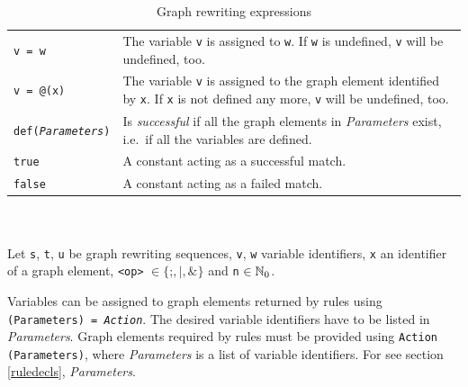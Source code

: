 \begin{table}[htbp]
\begin{minipage}{\linewidth}
\begin{tabularx}{\linewidth}{|lX|}
\texttt{v = w}	& The variable \texttt{v} is assigned to \texttt{w}. If \texttt{w} is undefined, \texttt{v} will be undefined, too.\\
\texttt{v = @(x)}	& The variable \texttt{v} is assigned to the graph element identified by \texttt{x}. If \texttt{x} is not defined any more, \texttt{v} will be undefined, too.\\
\texttt{def(\emph{Parameters})} & Is \emph{successful} if all the graph elements in \emph{Parameters} exist, i.e.\ if all the variables are defined.\\
\texttt{true}	& A constant acting as a successful match.\\
\texttt{false}	& A constant acting as a failed match.\\ \hline
\end{tabularx}\indexmain{\texttt{;}}
\indexmain{\texttt{\&}}\indexmain{\texttt{*}}
\end{minipage}\\
\\ 
{\small Let \texttt{s}, \texttt{t}, \texttt{u} be graph rewriting sequences, \texttt{v}, \texttt{w} variable identifiers, \texttt{x} an identifier of a graph element, \texttt{<op>} $\in \{\texttt{;}, \texttt{|}, \texttt{\&}\}$ and \texttt{n} $\in \mathbb{N}_0$.}
\caption{Graph rewriting expressions}
\label{ruletab}
\end{table}
\makeatother

Variables can be assigned to graph elements returned by rules using \texttt{(Para\-meters) = \emph{Action}}. 
The desired variable identifiers have to be listed in \emph{Parameters}. 
Graph elements required by rules must be provided using \texttt{Action (Para\-meters)}, where \emph{Parameters} is a list of variable identifiers. 
For  see section \ref{ruledecls}, \emph{Parameters}.

